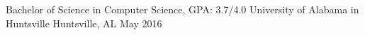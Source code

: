 
\begin{cventries}
  \cventry
    {Bachelor of Science in Computer Science, GPA: 3.7/4.0} %
    {University of Alabama in Huntsville} %
    {Huntsville, AL} %
    {May 2016} %
    {
       \begin{cvitems} %
       \end{cvitems}
    }

\end{cventries}
